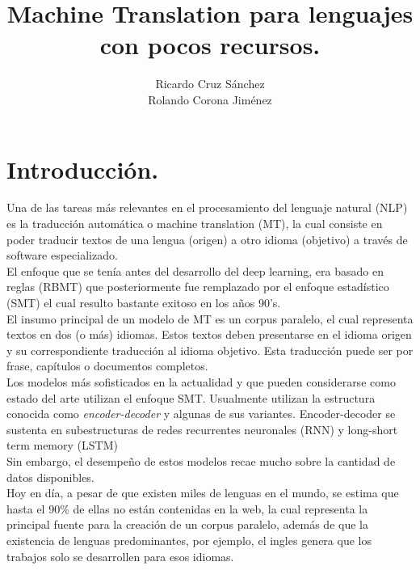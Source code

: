 \documentclass[12pt,twocolumn, letterpaper]{article}
\begin{document}
   \title{Machine Translation para lenguajes con pocos recursos.}
   	\author{Ricardo Cruz Sánchez\\
   	Rolando Corona Jiménez
   	}
   \maketitle
%




\section{Introducción.}
Una de las tareas más relevantes en el procesamiento del lenguaje natural (NLP) es la traducción automática o machine translation (MT), la cual consiste en poder traducir textos de una lengua (origen) a otro idioma (objetivo) a través de software especializado.\\

El enfoque que se tenía antes del desarrollo del deep learning, era basado en reglas (RBMT) que posteriormente fue remplazado por el enfoque estadístico (SMT) el cual resulto bastante exitoso en los años 90's.\\

El insumo principal de un modelo de MT es un corpus paralelo, el cual representa textos en dos (o más) idiomas. Estos textos deben presentarse en el idioma origen y su correspondiente traducción al idioma objetivo. Esta traducción puede ser por frase, capítulos o documentos completos.\\

Los modelos más sofisticados en la actualidad y que pueden considerarse como estado del arte utilizan el enfoque SMT. Usualmente utilizan la estructura conocida como \emph{encoder-decoder} y algunas de sus variantes. Encoder-decoder se sustenta en subestructuras de redes recurrentes neuronales (RNN) y long-short term memory (LSTM)\\

Sin embargo, el desempeño de estos modelos recae mucho sobre la cantidad de datos disponibles.\\

Hoy en día, a pesar de que existen miles de lenguas en el mundo, se estima que hasta el 90\% de ellas no están contenidas en la web, la cual representa la principal fuente para la creación de un corpus paralelo, además de que la existencia de lenguas predominantes, por ejemplo, el ingles genera que los trabajos solo se desarrollen para esos idiomas.\\
\end{document}
